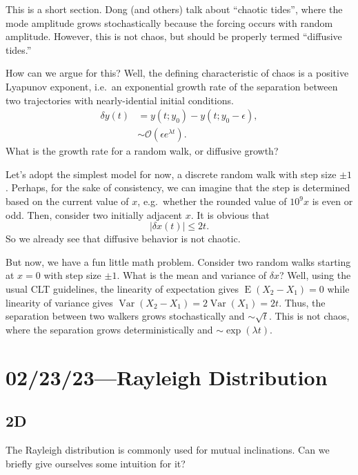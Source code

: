 \documentclass[12pt]{article}
\newcommand*{\abs}[1]{\left|#1\right|}
\newcommand*{\p}[1]{\left(#1\right)}
\DeclareMathOperator{\E}{E}
\DeclareMathOperator{\Var}{Var}
\begin{document}
This is a short section. Dong (and others) talk about ``chaotic tides'', where
the mode amplitude grows stochastically because the forcing occurs with random
amplitude. However, this is not chaos, but should be properly termed ``diffusive
tides.''

How can we argue for this? Well, the defining characteristic of chaos is a
positive Lyapunov exponent, i.e.\ an exponential growth rate of the separation
between two trajectories with nearly-idential initial conditions.
\begin{align}
    \delta y(t) &= y(t; y_0) - y(t; y_0 - \epsilon),\\
        &\sim \mathcal{O}(\epsilon e^{\lambda t}).
\end{align}
What is the growth rate for a random walk, or diffusive growth?

Let's adopt the simplest model for now, a discrete random walk with step size
$\pm 1$. Perhaps, for the sake of consistency, we can imagine that the step is
determined based on the current value of $x$, e.g.\ whether the rounded value of
$10^9 x$ is even or odd. Then, consider two initially adjacent $x$. It is
obvious that
\begin{equation}
    \abs{\delta x(t)} \leq 2t.
\end{equation}
So we already see that diffusive behavior is not chaotic.

But now, we have a fun little math problem. Consider two random walks starting
at $x = 0$ with step size $\pm 1$. What is the mean and variance of $\delta x$?
Well, using the usual CLT guidelines, the linearity of expectation gives
$\E\p{X_2 - X_1} = 0$ while linearity of variance gives $\Var\p{X_2 - X_1} =
2\Var(X_1) = 2t$. Thus, the separation between two walkers grows stochastically
and $\sim \sqrt{t}$. This is not chaos, where the separation grows
deterministically and $\sim \exp\p{\lambda t}$.

\section{02/23/23---Rayleigh Distribution}

\subsection{2D}

The Rayleigh distribution is commonly used for mutual inclinations. Can we
briefly give ourselves some intuition for it?
\end{document}
